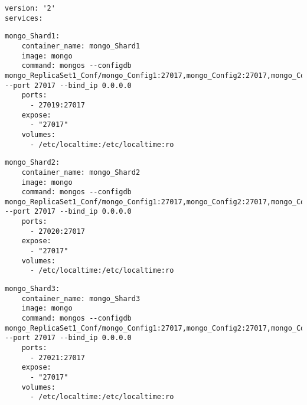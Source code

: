 \begin{lstlisting}[caption=Docker Compose Router Version]
version: '2'
services:
\end{lstlisting}

\begin{lstlisting}[caption=Docker Compose router 1]
mongo_Shard1:
    container_name: mongo_Shard1
    image: mongo
    command: mongos --configdb mongo_ReplicaSet1_Conf/mongo_Config1:27017,mongo_Config2:27017,mongo_Config3:27017 --port 27017 --bind_ip 0.0.0.0
    ports:
      - 27019:27017
    expose:
      - "27017"
    volumes:
      - /etc/localtime:/etc/localtime:ro
\end{lstlisting}

\begin{lstlisting}[caption=Docker Compose router 2]
  mongo_Shard2:
    container_name: mongo_Shard2
    image: mongo
    command: mongos --configdb mongo_ReplicaSet1_Conf/mongo_Config1:27017,mongo_Config2:27017,mongo_Config3:27017 --port 27017 --bind_ip 0.0.0.0
    ports:
      - 27020:27017
    expose:
      - "27017"
    volumes:
      - /etc/localtime:/etc/localtime:ro
\end{lstlisting}

\begin{lstlisting}[caption=Docker Compose router 3]
  mongo_Shard3:
    container_name: mongo_Shard3
    image: mongo
    command: mongos --configdb mongo_ReplicaSet1_Conf/mongo_Config1:27017,mongo_Config2:27017,mongo_Config3:27017 --port 27017 --bind_ip 0.0.0.0
    ports:
      - 27021:27017
    expose:
      - "27017"
    volumes:
      - /etc/localtime:/etc/localtime:ro
\end{lstlisting}